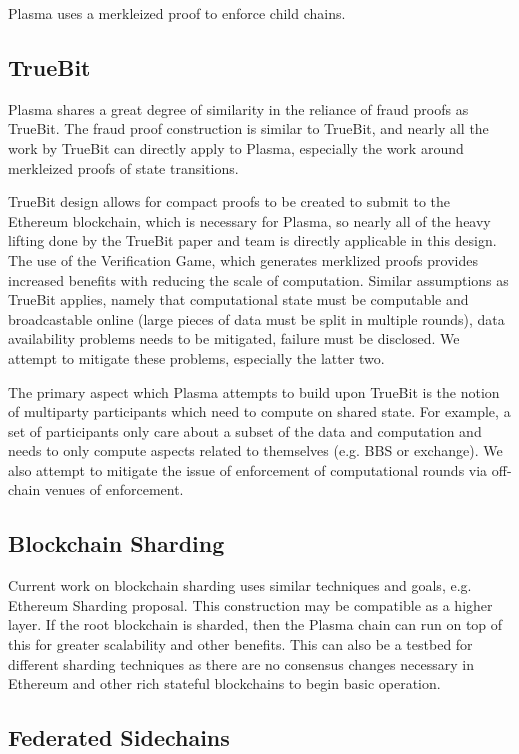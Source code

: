 \documentclass[letterpaper, 11pt]{article}
\begin{document}
Plasma uses a merkleized proof to enforce child chains.

\subsection{TrueBit}

Plasma shares a great degree of similarity in the reliance of fraud proofs as
TrueBit\cite{truebit}. The fraud proof construction is similar to TrueBit, and
nearly all the work by TrueBit can directly apply to Plasma, especially the
work around merkleized proofs of state transitions.

TrueBit design allows for compact proofs to be created to submit to the Ethereum
blockchain, which is necessary for Plasma, so nearly all of the heavy lifting
done by the TrueBit paper and team is directly applicable in this design. The
use of the Verification Game, which generates merklized proofs provides
increased benefits with reducing the scale of computation. Similar assumptions
as TrueBit applies, namely that computational state must be computable and
broadcastable online (large pieces of data must be split in multiple rounds),
data availability problems needs to be mitigated, failure must be disclosed. We
attempt to mitigate these problems, especially the latter two.

The primary aspect which Plasma attempts to build upon TrueBit is the notion of
multiparty participants which need to compute on shared state. For example, a
set of participants only care about a subset of the data and computation and
needs to only compute aspects related to themselves (e.g. BBS or exchange). We
also attempt to mitigate the issue of enforcement of computational rounds via
off-chain venues of enforcement.

\subsection{Blockchain Sharding}

Current work on blockchain sharding\cite{ethsharding} uses similar
techniques and goals, e.g. Ethereum Sharding proposal. This construction may be
compatible as a higher layer. If the root blockchain is sharded, then the
Plasma chain can run on top of this for greater scalability and other benefits.
This can also be a testbed for different sharding techniques as there are no
consensus changes necessary in Ethereum and other rich stateful blockchains to
begin basic operation.

\subsection{Federated Sidechains}
\end{document}
